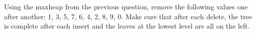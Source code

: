 Using the maxheap from the previous question,
remove the following values one after another:
1, 3, 5, 7, 6, 4, 2, 8, 9, 0.
Make sure that after each delete, the tree is complete after each insert and the leaves
at the lowest level are all on the left.
